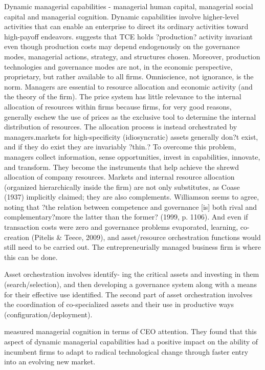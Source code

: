 \documentclass[12pt,letterpaper]{article}
\begin{document}
Dynamic managerial capabilities \cite{Adner2003} - managerial human capital, managerial social capital and managerial cognition. Dynamic capabilities involve higher-level activities that can enable an enterprise to direct its ordinary activities toward high-payoff endeavors. \cite{Teece2014b} suggests that TCE holds ?production? activity invariant even though production costs may depend endogenously on the governance modes, managerial actions, strategy, and structures chosen. Moreover, production technologies and governance modes are not, in the economic perspective, proprietary, but rather available to all firms. Omniscience, not ignorance, is the norm. Managers are essential to resource allocation and
economic activity (and the theory of the firm). The price system has little relevance to the internal allocation of resources within firms because firms, for very good reasons, generally eschew the use of prices as the exclusive tool to determine the internal distribution of resources. The allocation process is instead orchestrated by managers.markets for high-specificity (idiosyncratic) assets generally don?t exist, and if they do exist they are invariably ?thin.? To overcome this problem, managers collect information, sense opportunities, invest in capabilities, innovate, and transform. They become the instruments that help achieve the shrewd allocation of company resources. Markets and internal resource allocation (organized hierarchically inside the
firm) are not only substitutes, as Coase (1937) implicitly claimed; they are also complements. Williamson seems to agree, noting that ?the relation between competence and governance [is] both rival and complementary?more the latter than the former?
(1999, p. 1106). And even if transaction costs were zero and governance problems evaporated, learning, co-creation (Pitelis \& Teece, 2009), and asset/resource orchestration functions would still need to be carried out. The entrepreneurially managed business firm is where this can be done.

Asset orchestration involves identify- ing the critical assets and investing in them (search/selection), and then developing a governance system along with a means for their effective use identified. The second part of asset orchestration involves the coordination of co-specialized assets and their use in productive ways (configuration/deployment).

\cite{Eggers2009} measured managerial cognition in terms of CEO attention. They found that this aspect of dynamic managerial capabilities had a positive impact on the ability of incumbent firms to adapt to radical technological change through faster entry into an evolving new market.
\end{document}
